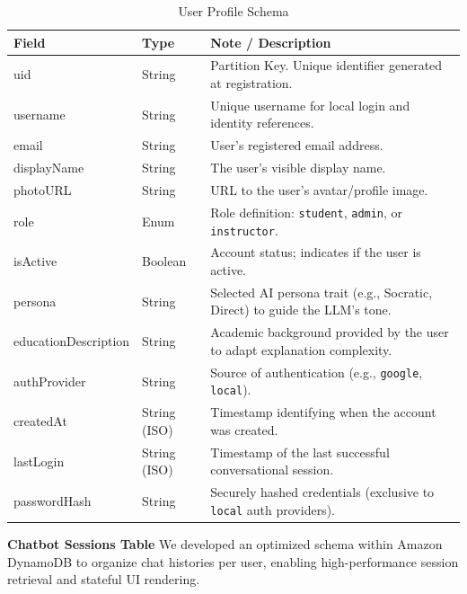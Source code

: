 \begin{table}[H]
    \centering
    \begin{tabular}{llp{8cm}}
        \toprule
        \textbf{Field} & \textbf{Type} & \textbf{Note / Description} \\
        \midrule
        uid & String & Partition Key. Unique identifier generated at registration. \\
        \midrule
        username & String & Unique username for local login and identity references. \\
        email & String & User's registered email address. \\
        displayName & String & The user's visible display name. \\
        photoURL & String & URL to the user's avatar/profile image. \\
        role & Enum & Role definition: \texttt{student}, \texttt{admin}, or \texttt{instructor}. \\
        isActive & Boolean & Account status; indicates if the user is active. \\
        persona & String & Selected AI persona trait (e.g., Socratic, Direct) to guide the LLM's tone. \\
        educationDescription & String & Academic background provided by the user to adapt explanation complexity. \\
        authProvider & String & Source of authentication (e.g., \texttt{google}, \texttt{local}). \\
        createdAt & String (ISO) & Timestamp identifying when the account was created. \\
        lastLogin & String (ISO) & Timestamp of the last successful conversational session. \\
        passwordHash & String & Securely hashed credentials (exclusive to \texttt{local} auth providers). \\
        \bottomrule
    \end{tabular}
    \caption{User Profile Schema}
    \label{tab:user_profiles}
\end{table}

\newpage

\textbf{Chatbot Sessions Table}
We developed an optimized schema within Amazon DynamoDB to organize chat histories per user, enabling high-performance session retrieval and stateful UI rendering.

